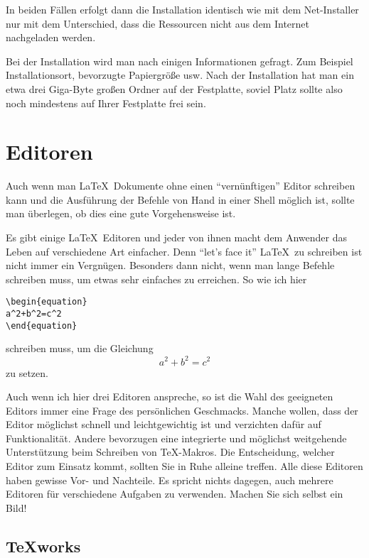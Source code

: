 In beiden Fällen erfolgt dann die Installation identisch wie mit dem Net-Installer nur mit dem Unterschied, dass die Ressourcen nicht aus dem Internet nachgeladen werden. 

Bei der Installation wird man nach einigen Informationen gefragt. Zum Beispiel Installationsort, bevorzugte Papiergröße usw. Nach der Installation hat man ein etwa drei Giga-Byte großen Ordner auf der Festplatte, soviel Platz sollte also noch mindestens auf Ihrer Festplatte frei sein.

\section{Editoren}

Auch wenn man \LaTeX\ Dokumente ohne einen "`vernünftigen"' Editor schreiben kann und die Ausführung der Befehle von Hand in einer Shell möglich ist, sollte man überlegen, ob dies eine gute Vorgehensweise ist. 

Es gibt einige \LaTeX\ Editoren und jeder von ihnen macht dem Anwender das Leben auf verschiedene Art einfacher. Denn "`let's face it"' \LaTeX\ zu schreiben ist nicht immer ein Vergnügen. Besonders dann nicht, wenn man lange Befehle schreiben muss, um etwas sehr einfaches zu erreichen. So wie ich hier 
\begin{verbatim}
\begin{equation}
a^2+b^2=c^2
\end{equation}
\end{verbatim}
schreiben muss, um die Gleichung
\begin{equation}
a^2+b^2=c^2
\end{equation}
zu setzen.

Auch wenn ich hier drei Editoren anspreche, so ist die Wahl des geeigneten Editors immer eine Frage des persönlichen Geschmacks. Manche wollen, dass der Editor möglichst schnell und leichtgewichtig ist und verzichten dafür auf Funktionalität. Andere bevorzugen eine integrierte und möglichst weitgehende Unterstützung beim Schreiben von \TeX-Makros. Die Entscheidung, welcher Editor zum Einsatz kommt, sollten Sie in Ruhe alleine treffen. Alle diese Editoren haben gewisse Vor- und Nachteile. Es spricht nichts dagegen, auch mehrere Editoren für verschiedene Aufgaben zu verwenden. Machen Sie sich selbst ein Bild!


\subsection{TeXworks}


